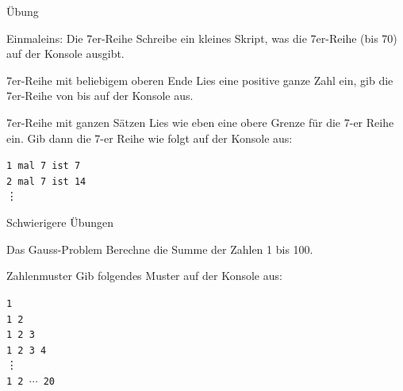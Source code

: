 \begin{frame}{Übung}

\begin{block}{Einmaleins: Die 7er-Reihe}
	\vspace{2pt}
Schreibe ein kleines Skript, was die 7er-Reihe (bis 70) auf der Konsole ausgibt.	
\end{block}

\vspace{12pt}

\pause 

\begin{block}{7er-Reihe mit beliebigem oberen Ende}
	\vspace{2pt}
	Lies eine positive ganze Zahl  ein, gib die 7er-Reihe von  bis  auf der Konsole aus.  
\end{block}

\vspace{12pt}

\pause 

\begin{block}{7er-Reihe mit ganzen Sätzen}
	\vspace{2pt}
Lies wie eben eine obere Grenze für die 7-er Reihe ein. Gib dann die 7-er Reihe wie folgt auf der Konsole aus:

\texttt{1 mal 7 ist 7}\\	
\texttt{2 mal 7 ist 14}\\
\phantom{4 mal} \vdots

\end{block}
\end{frame}


\begin{frame}{Schwierigere Übungen}

\begin{block}{Das Gauss-Problem}
\vspace{2pt}	
Berechne die Summe der Zahlen 1 bis 100. 
\end{block}
\vspace{12pt}
\pause
\begin{block}{Zahlenmuster}
\vspace{2pt}	
Gib folgendes Muster auf der Konsole aus: 

\texttt{1} \\
\texttt{1 2} \\
\texttt{1 2 3} \\
\texttt{1 2 3 4} \\
\phantom{1 2 } \vdots \\
\texttt{1 2 $\cdots$ 20}
\end{block}

\end{frame}

